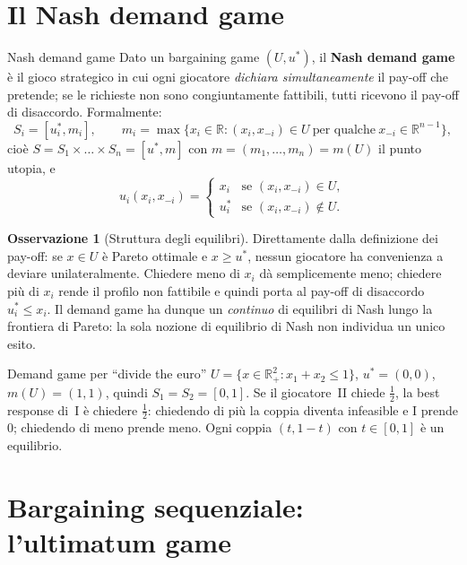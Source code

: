 \documentclass[12pt,a4paper,twoside]{book}
\theoremstyle{plain}
\theoremstyle{definition}
\newtheorem{remark}[theorem]{Osservazione}
\begin{document}
\section{Il Nash demand game}

\begin{defbox}{Nash demand game}
Dato un bargaining game $(U,u^*)$, il \textbf{Nash demand game} è il gioco strategico in cui
ogni giocatore \emph{dichiara simultaneamente} il pay-off che pretende; se le richieste non
sono congiuntamente fattibili, tutti ricevono il pay-off di disaccordo. Formalmente:
\[
  S_i=[u^*_i,m_i],\qquad
  m_i=\max\{x_i\in\mathbb{R} : (x_i,x_{-i})\in U\ \text{per qualche}\ x_{-i}\in\mathbb{R}^{n-1}\},
\]
cioè $S=S_1\times\dots\times S_n=[u^*,m]$ con $m=(m_1,\dots,m_n)=m(U)$ il punto utopia, e
\[
  u_i(x_i,x_{-i})=
  \begin{cases}
    x_i & \text{se } (x_i,x_{-i})\in U,\\
    u^*_i & \text{se } (x_i,x_{-i})\notin U.
  \end{cases}
\]
\end{defbox}

\begin{remark}[Struttura degli equilibri]
Direttamente dalla definizione dei pay-off: se $x\in U$ è Pareto ottimale e $x\ge u^*$,
nessun giocatore ha convenienza a deviare unilateralmente. Chiedere meno di $x_i$ dà
semplicemente meno; chiedere più di $x_i$ rende il profilo non fattibile e quindi porta al
pay-off di disaccordo $u^*_i\le x_i$. Il demand game ha dunque un \emph{continuo} di
equilibri di Nash lungo la frontiera di Pareto: la sola nozione di equilibrio di Nash non
individua un unico esito.
\end{remark}

\begin{exbox}{Demand game per ``divide the euro''}
$U=\{x\in\mathbb{R}^2_+:x_1+x_2\le1\}$, $u^*=(0,0)$, $m(U)=(1,1)$, quindi
$S_1=S_2=[0,1]$. Se il giocatore~II chiede $\tfrac12$, la best response di~I è chiedere
$\tfrac12$: chiedendo di più la coppia diventa infeasible e I prende $0$; chiedendo di meno
prende meno. Ogni coppia $(t,1-t)$ con $t\in[0,1]$ è un equilibrio.
\end{exbox}

\section{Bargaining sequenziale: l'ultimatum game}
\end{document}
